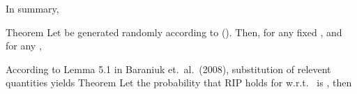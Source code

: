 
In summary,

\Result
{Theorem}
{
Let  be generated randomly according to ().
Then, for any fixed , and for any ,
}

According to Lemma 5.1 in Baraniuk et.\ al.\ (2008), substitution of relevent quantities yields
\Result
{Theorem}
{
Let the probability that RIP holds for  w.r.t.\  is , then
}

\stopsubsection
\stopsection



